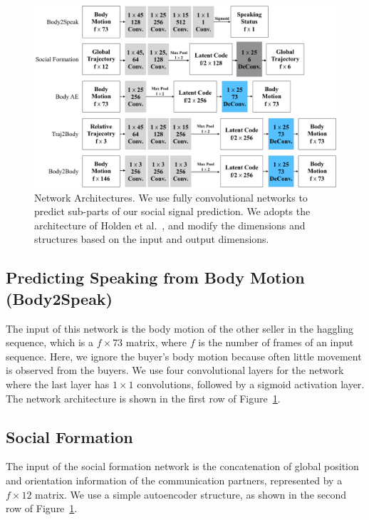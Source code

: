 \begin{figure}[t]	
	\includegraphics[width=\textwidth]{ssp_fig/networks}
	\caption{Network Architectures. We use fully convolutional networks to predict sub-parts of our social signal prediction. We adopts the architecture of Holden et al.~\cite{holden2016deep}, and modify the dimensions and structures based on the input and output dimensions. }
	\label{fig:architectures}
\end{figure}



\subsection{Predicting Speaking from Body Motion (Body2Speak)}
The input of this network is the body motion of the other seller in the haggling sequence, which is a $f \times 73$ matrix, where $f$ is the number of frames of an input sequence. Here, we ignore the buyer's body motion because often little movement is observed from the buyers.  We use four convolutional layers for the network where the last layer has $1\times1$ convolutions, followed by a sigmoid activation layer. The network architecture is shown in the first row of Figure~\ref{fig:architectures}.


\subsection{Social Formation}
The input of the social formation network is the concatenation of global position and orientation information of the communication partners, represented by a $f \times 12$ matrix.  We use a simple autoencoder structure, as shown in the second row of Figure~\ref{fig:architectures}.

